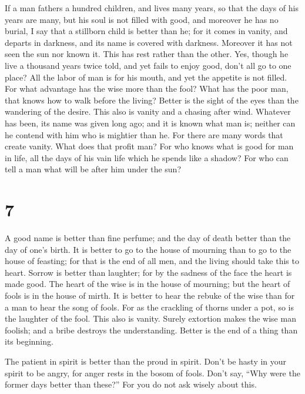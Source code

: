  If a man fathers a hundred children, and lives many years,
so that the days of his years are many, but his soul is not filled with
good, and moreover he has no burial, I say that a stillborn child is
better than he;  for it comes in vanity, and departs in
darkness, and its name is covered with darkness.  Moreover
it has not seen the sun nor known it. This has rest rather than the
other.  Yes, though he live a thousand years twice told, and
yet fails to enjoy good, don't all go to one place?  All the
labor of man is for his mouth, and yet the appetite is not filled.
 For what advantage has the wise more than the fool? What
has the poor man, that knows how to walk before the living? 
Better is the sight of the eyes than the wandering of the desire. This
also is vanity and a chasing after wind.  Whatever has
been, its name was given long ago; and it is known what man is; neither
can he contend with him who is mightier than he.  For there
are many words that create vanity. What does that profit man?
 For who knows what is good for man in life, all the days
of his vain life which he spends like a shadow? For who can tell a man
what will be after him under the sun?

\hypertarget{section-6}{%
\section{7}\label{section-6}}

 A good name is better than fine perfume; and the day of
death better than the day of one's birth.  It is better to
go to the house of mourning than to go to the house of feasting; for
that is the end of all men, and the living should take this to heart.
 Sorrow is better than laughter; for by the sadness of the
face the heart is made good.  The heart of the wise is in
the house of mourning; but the heart of fools is in the house of mirth.
 It is better to hear the rebuke of the wise than for a man
to hear the song of fools.  For as the crackling of thorns
under a pot, so is the laughter of the fool. This also is vanity.
 Surely extortion makes the wise man foolish; and a bribe
destroys the understanding.  Better is the end of a thing
than its beginning.

The patient in spirit is better than the proud in spirit. 
Don't be hasty in your spirit to be angry, for anger rests in the bosom
of fools.  Don't say, ``Why were the former days better
than these?'' For you do not ask wisely about this.

